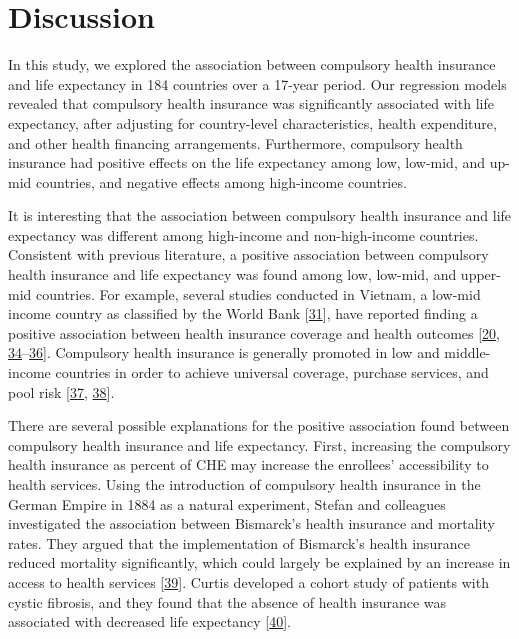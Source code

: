 \documentclass[]{elsarticle} %
\begin{document}
\hypertarget{discussion}{%
\section{Discussion}\label{discussion}}

In this study, we explored the association between compulsory health insurance and life expectancy in 184 countries over a 17-year period.
Our regression models revealed that compulsory health insurance was significantly associated with life expectancy, after adjusting for country-level characteristics, health expenditure, and other health financing arrangements.
Furthermore, compulsory health insurance had positive effects on the life expectancy among low, low-mid, and up-mid countries, and negative effects among high-income countries.

It is interesting that the association between compulsory health insurance and life expectancy was different among high-income and non-high-income countries.
Consistent with previous literature, a positive association between compulsory health insurance and life expectancy was found among low, low-mid, and upper-mid countries.
For example, several studies conducted in Vietnam, a low-mid income country as classified by the World Bank {[}\protect\hyperlink{ref-worldbankincome}{31}{]}, have reported finding a positive association between health insurance coverage and health outcomes {[}\protect\hyperlink{ref-jowett2003impact}{20}, \protect\hyperlink{ref-jowett2004health}{34}--\protect\hyperlink{ref-Nguyen2012}{36}{]}.
Compulsory health insurance is generally promoted in low and middle-income countries in order to achieve universal coverage, purchase services, and pool risk {[}\protect\hyperlink{ref-barnighausen2002one}{37}, \protect\hyperlink{ref-lagomarsino2012moving}{38}{]}.

There are several possible explanations for the positive association found between compulsory health insurance and life expectancy.
First, increasing the compulsory health insurance as percent of CHE may increase the enrollees' accessibility to health services.
Using the introduction of compulsory health insurance in the German Empire in 1884 as a natural experiment, Stefan and colleagues investigated the association between Bismarck's health insurance and mortality rates.
They argued that the implementation of Bismarck's health insurance reduced mortality significantly, which could largely be explained by an increase in access to health services {[}\protect\hyperlink{ref-bauernschuster2017bismarck}{39}{]}.
Curtis developed a cohort study of patients with cystic fibrosis, and they found that the absence of health insurance was associated with decreased life expectancy {[}\protect\hyperlink{ref-Curtis1997}{40}{]}.
\end{document}
